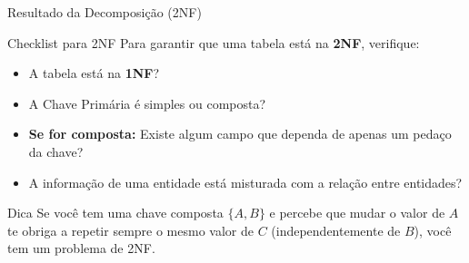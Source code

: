 \documentclass[9pt]{beamer}
\begin{document}
\begin{frame}{Resultado da Decomposição (2NF)}
  \centering
\end{frame}

\begin{frame}{Checklist para 2NF}
  Para garantir que uma tabela está na \textbf{2NF}, verifique:
  \vspace{0.4cm}
  \begin{itemize}
    \item[$\square$] A tabela está na \textbf{1NF}?
    \item[$\square$] A Chave Primária é simples ou composta?
    \item[$\square$] \textbf{Se for composta:} Existe algum campo que dependa de apenas um pedaço da chave?
    \item[$\square$] A informação de uma entidade está misturada com a relação entre entidades?
  \end{itemize}
  \vspace{0.4cm}
  \begin{block}{Dica}
    Se você tem uma chave composta $\{A, B\}$ e percebe que mudar o valor de $A$ te obriga a repetir sempre o mesmo valor de $C$ (independentemente de $B$), você tem um problema de 2NF.
  \end{block}
\end{frame}
\end{document}
